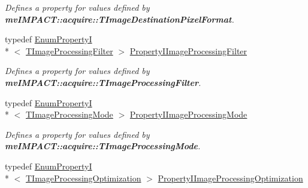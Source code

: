 \begin{DoxyCompactItemize}
\begin{DoxyCompactList}\small\item\em Defines a property for values defined by {\bfseries mv\+I\+M\+P\+A\+C\+T\+::acquire\+::\+T\+Image\+Destination\+Pixel\+Format}. \end{DoxyCompactList}\item 
\hypertarget{group___common_interface_ga32f5b5edac93671f54854b4a76f0057e}{typedef \hyperlink{classmv_i_m_p_a_c_t_1_1acquire_1_1_enum_property_i}{Enum\+Property\+I}\\*
$<$ \hyperlink{group___common_interface_ga78ae15c334c800044e1b7042975fc829}{T\+Image\+Processing\+Filter} $>$ \hyperlink{group___common_interface_ga32f5b5edac93671f54854b4a76f0057e}{Property\+I\+Image\+Processing\+Filter}}\label{group___common_interface_ga32f5b5edac93671f54854b4a76f0057e}

\begin{DoxyCompactList}\small\item\em Defines a property for values defined by {\bfseries mv\+I\+M\+P\+A\+C\+T\+::acquire\+::\+T\+Image\+Processing\+Filter}. \end{DoxyCompactList}\item 
\hypertarget{group___common_interface_ga12e3e1568fb58b1cb24383af267c53f7}{typedef \hyperlink{classmv_i_m_p_a_c_t_1_1acquire_1_1_enum_property_i}{Enum\+Property\+I}\\*
$<$ \hyperlink{group___common_interface_gaee0074fce284fcdf9ead4ad607e85a06}{T\+Image\+Processing\+Mode} $>$ \hyperlink{group___common_interface_ga12e3e1568fb58b1cb24383af267c53f7}{Property\+I\+Image\+Processing\+Mode}}\label{group___common_interface_ga12e3e1568fb58b1cb24383af267c53f7}

\begin{DoxyCompactList}\small\item\em Defines a property for values defined by {\bfseries mv\+I\+M\+P\+A\+C\+T\+::acquire\+::\+T\+Image\+Processing\+Mode}. \end{DoxyCompactList}\item 
\hypertarget{group___common_interface_gad70153dd4d03d0db8f97382da8ae2d05}{typedef \hyperlink{classmv_i_m_p_a_c_t_1_1acquire_1_1_enum_property_i}{Enum\+Property\+I}\\*
$<$ \hyperlink{group___common_interface_ga9f8538d596e064d7854f355679357965}{T\+Image\+Processing\+Optimization} $>$ \hyperlink{group___common_interface_gad70153dd4d03d0db8f97382da8ae2d05}{Property\+I\+Image\+Processing\+Optimization}}\label{group___common_interface_gad70153dd4d03d0db8f97382da8ae2d05}


\end{DoxyCompactItemize}
